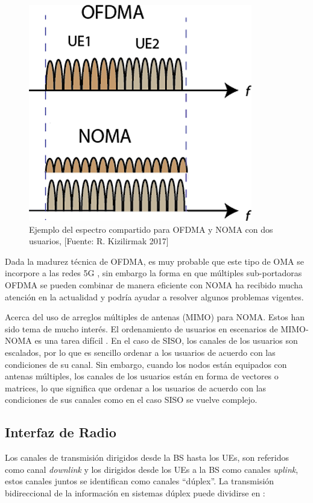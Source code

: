 \begin{figure}[th]
\centering
\includegraphics[scale=.87]{Figures/Ejemplo del espectro compartido para OFDMA y NOMA con dos usuarios}
\decoRule
\caption[Ejemplo del espectro compartido para OFDMA y NOMA con dos usuarios.]{Ejemplo del espectro compartido para OFDMA y NOMA con dos usuarios, [Fuente: R. Kizilirmak 2017]}
\label{fig:OFDMANOMA}
\end{figure}

Dada la madurez técnica de OFDMA, es muy probable que este tipo de OMA se incorpore a las redes 5G \parencite{DIng2017}, sin embargo la forma en que múltiples sub-portadoras OFDMA se pueden combinar de manera eficiente con NOMA ha recibido mucha atención en la actualidad y podría ayudar a resolver algunos problemas vigentes.\newline

Acerca del uso de arreglos múltiples de antenas (MIMO) para NOMA. Estos han sido tema de mucho interés. El ordenamiento de usuarios en escenarios de MIMO-NOMA es una tarea difícil \parencite{DIng2017}. En el caso de SISO, los canales de los usuarios son escalados, por lo que es sencillo ordenar a los usuarios de acuerdo con las condiciones de su canal. Sin embargo, cuando los nodos están equipados con antenas múltiples, los canales de los usuarios están en forma de vectores o matrices, lo que significa que ordenar a los usuarios de acuerdo con las condiciones de sus canales como en el caso SISO se vuelve complejo.

\subsection{Interfaz de Radio}
Los canales de transmisión dirigidos desde la BS hasta los UEs, son referidos como canal \textit{downlink} y los dirigidos desde los UEs a la BS como canales \textit{uplink}, estos canales juntos se identifican como canales ``dúplex''. La transmisión bidireccional de la información en sistemas dúplex puede dividirse en \parencite{Correia2018}:

